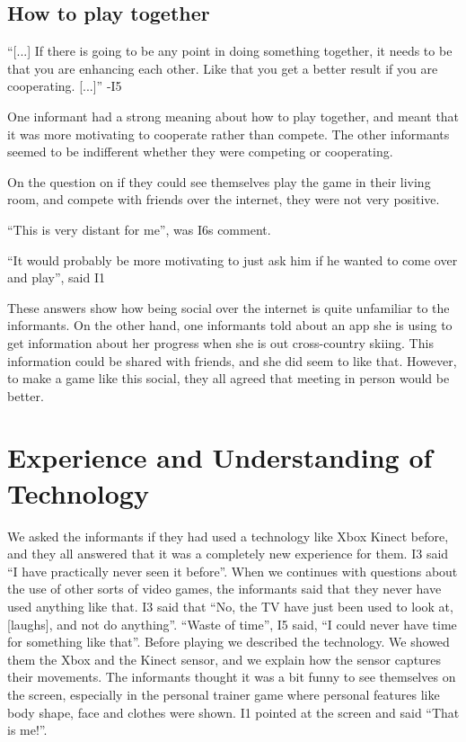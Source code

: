 \subsection{How to play together}
“[...] If there is going to be any point in doing something together, it needs to be that you are enhancing each other. Like that you get a better result if you are cooperating. [...]” -I5

One informant had a strong meaning about how to play together, and meant that it was more motivating to cooperate rather than compete. The other informants seemed to be indifferent whether they were competing or cooperating.

On the question on if they could see themselves play the game in their living room, and compete with friends over the internet, they were not very positive.

“This is very distant for me”, was I6s comment.

“It would probably be more motivating to just ask him if he wanted to come over and play”, said I1

These answers show how being social over the internet is quite unfamiliar to the informants. On the other hand, one informants told about an app she is using to get information about her progress when she is out cross-country skiing. This information could be shared with friends, and she did seem to like that. However, to make a game like this social, they all agreed that meeting in person would be better.

\section{Experience and Understanding of Technology}
We asked the informants if they had used a technology like Xbox Kinect before, and they all answered that it was a completely new experience for them. I3 said “I have practically never seen it before”. When we continues with questions about the use of other sorts of video games, the informants said that they never have used anything like that. I3 said that “No, the TV have just been used to look at, [laughs], and not do anything”. “Waste of time”, I5 said, “I could never have time for something like that”.  Before playing we described the technology. We showed them the Xbox and the Kinect sensor, and we explain how the sensor captures their movements. The informants thought it was a bit funny to see themselves on the screen, especially in the personal trainer game where personal features like body shape, face and clothes were shown. I1 pointed at the screen and said “That is me!”. 

